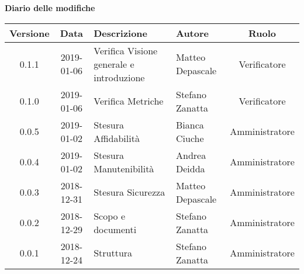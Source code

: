 	\begin{center}
		\textbf{Diario delle modifiche}
	\end{center}
	\begin{center}
		\begin{tabularx}{\textwidth}{|c|c|X|X|c|}
			\hline
			\textbf{Versione} & \textbf{Data} & \textbf{Descrizione} & \textbf{Autore} & \textbf{Ruolo} \\
			\hline
			0.1.1 & 2019-01-06 & Verifica Visione generale e introduzione & Matteo Depascale & Verificatore\\
			0.1.0 & 2019-01-06 & Verifica Metriche & Stefano Zanatta & Verificatore\\
			0.0.5 & 2019-01-02 & Stesura Affidabilità & Bianca Ciuche & Amministratore\\
			0.0.4 & 2019-01-02 & Stesura Manutenibilità & Andrea Deidda & Amministratore\\
			0.0.3 & 2018-12-31 & Stesura Sicurezza & Matteo Depascale & Amministratore\\
			0.0.2 & 2018-12-29 & Scopo e documenti & Stefano Zanatta & Amministratore\\
			0.0.1 & 2018-12-24 & Struttura & Stefano Zanatta & Amministratore\\
			\hline
		\end{tabularx}
	\end{center}
\newpage